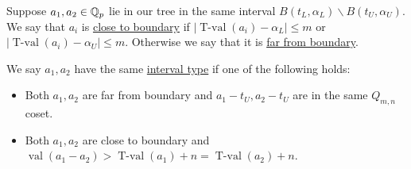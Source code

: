 \documentclass{amsart}
\newcommand{\curly}[1]{\left\{#1\right\}}
\newcommand{\paren}[1]{\left(#1\right)}
\DeclareMathOperator{\val}{val}
\DeclareMathOperator{\vval}{val}
\DeclareMathOperator{\tval}{T-val}
\newcommand{\defn}{\underline}
\begin{document}
\begin{Definition}
  Suppose $a_1, a_2 \in \mathbb{Q}_p$ lie in our tree in the same interval $B(t_L, \alpha_L) \backslash B(t_U, \alpha_U)$.
  We say that $a_i$ is \defn{close to boundary} if $|\tval(a_i) - \alpha_L| \leq m$ or $|\tval(a_i) - \alpha_U| \leq m$.
  Otherwise we say that it is \defn{far from boundary}.
\end{Definition}

\begin{Definition}
  We say $a_1, a_2$ have the same \defn{interval type} if one of the following holds:
  \begin{itemize}
  \item Both $a_1, a_2$ are far from boundary and $a_1 - t_U, a_2 - t_U$ are in the same $Q_{m,n}$ coset.
  \item Both $a_1, a_2$ are close to boundary and $\vval(a_1 - a_2) > \tval(a_1) + n = \tval(a_2) + n$.
  \end{itemize}      
\end{Definition}






  
\end{document}
